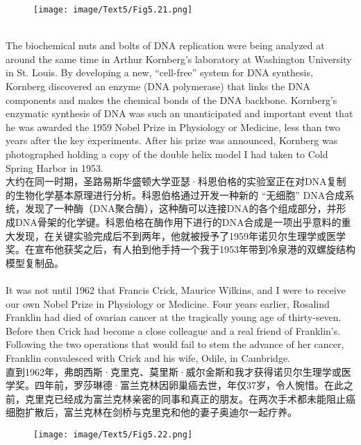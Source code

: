 \documentclass{article}
\begin{document}
\begin{figure}
    \centering
    \texttt{[image: image/Text5/Fig5.21.png]}
\end{figure}

\\
The biochemical nuts and bolts of DNA replication were being analyzed at around the same time in Arthur Kornberg’s laboratory at Washington University in St. Louis. By developing a new, “cell-free” system for DNA synthesis, Kornberg discovered an enzyme (DNA polymerase) that links the DNA components and makes the chemical bonds of the DNA backbone. Kornberg’s enzymatic synthesis of DNA was such an unanticipated and important event that he was awarded the 1959 Nobel Prize in Physiology or Medicine, less than two years after the key experiments. After his prize was announced, Kornberg was photographed holding a copy of the double helix model I had taken to Cold Spring Harbor in 1953.\\
大约在同一时期，圣路易斯华盛顿大学亚瑟·科恩伯格的实验室正在对DNA复制的生物化学基本原理进行分析。科恩伯格通过开发一种新的 “无细胞” DNA合成系统，发现了一种酶（DNA聚合酶），这种酶可以连接DNA的各个组成部分，并形成DNA骨架的化学键。科恩伯格在酶作用下进行的DNA合成是一项出乎意料的重大发现，在关键实验完成后不到两年，他就被授予了1959年诺贝尔生理学或医学奖。在宣布他获奖之后，有人拍到他手持一个我于1953年带到冷泉港的双螺旋结构模型复制品。\\

\\
It was not until 1962 that Francis Crick, Maurice Wilkins, and I were to receive our own Nobel Prize in Physiology or Medicine. Four years earlier, Rosalind Franklin had died of ovarian cancer at the tragically young age of thirty-seven. Before then Crick had become a close colleague and a real friend of Franklin’s. Following the two operations that would fail to stem the advance of her cancer, Franklin convalesced with Crick and his wife, Odile, in Cambridge.\\
直到1962年，弗朗西斯·克里克、莫里斯·威尔金斯和我才获得诺贝尔生理学或医学奖。四年前，罗莎琳德·富兰克林因卵巢癌去世，年仅37岁，令人惋惜。在此之前，克里克已经成为富兰克林亲密的同事和真正的朋友。在两次手术都未能阻止癌细胞扩散后，富兰克林在剑桥与克里克和他的妻子奥迪尔一起疗养。\\ 

\begin{figure}
    \centering
    \texttt{[image: image/Text5/Fig5.22.png]}
\end{figure}
\end{document}

